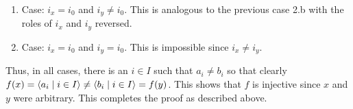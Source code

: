 {{\begin{enumerate}
\begin{enumerate}
\begin{enumerate}
                            \begin{enumerate}
                              \item Case: $b_{i_y} = y = \a_{i_y}$.
                                    Since $i_x \neq i_y$ and $i_x \neq i_0$ and $y = \a_{i_y}$, we have $b_{i_x} = \b_{i_x} \neq \a_{i_x} = a_{i_x}$.
                              \item Case: $b_{i_y} = y \neq \a_{i_y}$.
                                    Since $i_y \neq i_x$ and $i_y = i_0$ and $x = \a_{i_x}$, we have $a_{i_y} = \a_{i_y} \neq b_{i_y}$.
                            \end{enumerate}
                      \item Case: $a_{i_x} = x \neq \a_{i_x}$.
                            \begin{enumerate}
                              \item Case: $b_{i_y} = y = \a_{i_y}$.
                                    Since $i_y \neq i_x$ and $i_y = i_0$ and $x \neq \a_{i_x}$, we have $a_{i_y} = \b_{i_y} \neq \a_{i_y} = b_{i_y}$.
                              \item Case: $b_{i_y} = y \neq \a_{i_y}$.
                                    Since $i_x \neq i_y$ and $i_x \neq i_0$ and $y \neq \a_{i_y}$, we have $b_{i_x} = \a_{i_x} \neq a_{i_x}$.
                            \end{enumerate}
                    \end{enumerate}
              \item Case: $i_x = i_0$ and $i_y \neq i_0$.
                    This is analogous  to the previous case 2.b with the roles of $i_x$ and $i_y$ reversed.
              \item Case: $i_x = i_0$ and $i_y = i_0$.
                    This is impossible since $i_x \neq i_y$.
            \end{enumerate}
    \end{enumerate}
    Thus, in all cases, there is an $i \in I$ such that $a_i \neq b_i$ so that clearly $f(x) = \left\langle a_i \mid i \in I \right\rangle \neq \left\langle b_i \mid i \in I \right\rangle = f(y)$.
    This shows that $f$ is injective since $x$ and $y$ were arbitrary.
    This completes the proof as described above.
  }
}


